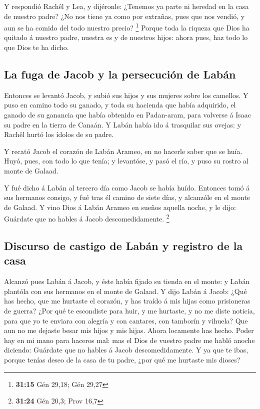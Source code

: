  Y respondió Rachêl y Lea, y dijéronle: ¿Tenemos ya parte
ni heredad en la casa de nuestro padre?  ¿No nos tiene ya
como por extrañas, pues que nos vendió, y aun se ha comido del todo
nuestro precio? \footnote{\textbf{31:15} Gén 29,18; Gén 29,27}
 Porque toda la riqueza que Dios ha quitado á nuestro
padre, nuestra es y de nuestros hijos: ahora pues, haz todo lo que Dios
te ha dicho.

\hypertarget{la-fuga-de-jacob-y-la-persecuciuxf3n-de-labuxe1n}{%
\subsection{La fuga de Jacob y la persecución de
Labán}\label{la-fuga-de-jacob-y-la-persecuciuxf3n-de-labuxe1n}}

 Entonces se levantó Jacob, y subió sus hijos y sus mujeres
sobre los camellos.  Y puso en camino todo su ganado, y
toda su hacienda que había adquirido, el ganado de su ganancia que había
obtenido en Padan-aram, para volverse á Isaac su padre en la tierra de
Canaán.  Y Labán había ido á trasquilar sus ovejas: y
Rachêl hurtó los ídolos de su padre.

 Y recató Jacob el corazón de Labán Arameo, en no hacerle
saber que se huía.  Huyó, pues, con todo lo que tenía; y
levantóse, y pasó el río, y puso su rostro al monte de Galaad.

 Y fué dicho á Labán al tercero día como Jacob se había
huído.  Entonces tomó á sus hermanos consigo, y fué tras él
camino de siete días, y alcanzóle en el monte de Galaad.  Y
vino Dios á Labán Arameo en sueños aquella noche, y le dijo: Guárdate
que no hables á Jacob descomedidamente. \footnote{\textbf{31:24} Gén
  20,3; Prov 16,7}

\hypertarget{discurso-de-castigo-de-labuxe1n-y-registro-de-la-casa}{%
\subsection{Discurso de castigo de Labán y registro de la
casa}\label{discurso-de-castigo-de-labuxe1n-y-registro-de-la-casa}}

 Alcanzó pues Labán á Jacob, y éste había fijado su tienda
en el monte: y Labán plantóla con sus hermanos en el monte de Galaad.
 Y dijo Labán á Jacob: ¿Qué has hecho, que me hurtaste el
corazón, y has traído á mis hijas como prisioneras de guerra?
 ¿Por qué te escondiste para huir, y me hurtaste, y no me
diste noticia, para que yo te enviara con alegría y con cantares, con
tamborín y vihuela?  Que aun no me dejaste besar mis hijos
y mis hijas. Ahora locamente has hecho.  Poder hay en mi
mano para haceros mal: mas el Dios de vuestro padre me habló anoche
diciendo: Guárdate que no hables á Jacob descomedidamente. 
Y ya que te ibas, porque tenías deseo de la casa de tu padre, ¿por qué
me hurtaste mis dioses?

